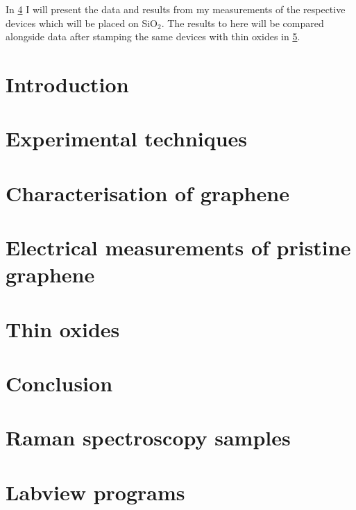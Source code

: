 \documentclass{report}
\begin{document}
	In \cref{chap:baregraphene} I will present the data and results from my measurements of the respective devices which will be placed on SiO$_2$. The results to here will be compared alongside data after stamping the same devices with thin oxides in  \cref{chap:thinoxides}.
	

	\chapter{Introduction}\label{chap:introduction}
	
	
	\chapter{Experimental techniques}\label{chap:experimental_techniques}
	
	
	\chapter{Characterisation of graphene}\label{chap:characterisation}
	
	
	\chapter{Electrical measurements of pristine graphene}\label{chap:baregraphene}
	
	
	\chapter{Thin oxides}\label{chap:thinoxides}
	
	
	\chapter{Conclusion}\label{chap:conclusion}
	
	
\listoffigures
\listoftables
	



\begin{appendices}
	\chapter{Raman spectroscopy samples}
	\chapter{Labview programs}
	
\end{appendices}
\end{document}

